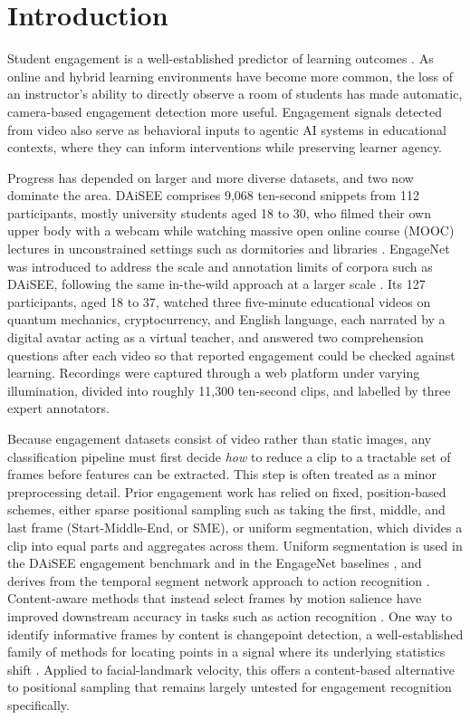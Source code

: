 \documentclass[11pt,a4paper]{article}
\begin{document}
\vspace{0.25cm}

\section{Introduction}

Student engagement is a well-established predictor of learning outcomes \citep{fredricks2004}. As online and hybrid learning environments have become more common, the loss of an instructor's ability to directly observe a room of students has made automatic, camera-based engagement detection more useful. Engagement signals detected from video also serve as behavioral inputs to agentic AI systems in educational contexts, where they can inform interventions while preserving learner agency.

Progress has depended on larger and more diverse datasets, and two now dominate the area. DAiSEE comprises 9,068 ten-second snippets from 112 participants, mostly university students aged 18 to 30, who filmed their own upper body with a webcam while watching massive open online course (MOOC) lectures in unconstrained settings such as dormitories and libraries \citep{gupta2016}. EngageNet was introduced to address the scale and annotation limits of corpora such as DAiSEE, following the same in-the-wild approach at a larger scale \citep{singh2023}. Its 127 participants, aged 18 to 37, watched three five-minute educational videos on quantum mechanics, cryptocurrency, and English language, each narrated by a digital avatar acting as a virtual teacher, and answered two comprehension questions after each video so that reported engagement could be checked against learning. Recordings were captured through a web platform under varying illumination, divided into roughly 11,300 ten-second clips, and labelled by three expert annotators.

Because engagement datasets consist of video rather than static images, any classification pipeline must first decide \textit{how} to reduce a clip to a tractable set of frames before features can be extracted. This step is often treated as a minor preprocessing detail. Prior engagement work has relied on fixed, position-based schemes, either sparse positional sampling such as taking the first, middle, and last frame (Start-Middle-End, or SME), or uniform segmentation, which divides a clip into equal parts and aggregates across them. Uniform segmentation is used in the DAiSEE engagement benchmark \citep{gupta2016} and in the EngageNet baselines \citep{singh2023}, and derives from the temporal segment network approach to action recognition \citep{wang2016}. Content-aware methods that instead select frames by motion salience have improved downstream accuracy in tasks such as action recognition \citep{korbar2019}. One way to identify informative frames by content is changepoint detection, a well-established family of methods for locating points in a signal where its underlying statistics shift \citep{truong2020}. Applied to facial-landmark velocity, this offers a content-based alternative to positional sampling that remains largely untested for engagement recognition specifically.
\end{document}
